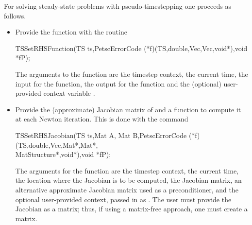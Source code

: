 For solving steady-state problems with pseudo-timestepping one proceeds 
as follows.
\begin{itemize}
\item Provide the function  with the routine
\begin{tabbing}
 TSSetRHSFunction(TS ts,PetscErrorCode (*f)(TS,double,Vec,Vec,void*),void *fP);
\end{tabbing}
The  arguments to the function  are
the timestep context, the current time, the input for the function,
the output for the function and the (optional) user-provided context
variable .

\item Provide the (approximate) Jacobian matrix of  and a 
function to compute it at each Newton iteration. This is done with the command
\begin{tabbing}
 TSSetRHSJacobian(\=TS ts,Mat A, Mat B,PetscErrorCode (*f)(TS,double,Vec,Mat*,Mat*,\\
                  \>        MatStructure*,void*),void *fP);
\end{tabbing}
The  arguments for the function  are
the timestep context, the current time, the location where the
Jacobian is to be computed, the Jacobian matrix, an alternative
approximate Jacobian matrix used as a preconditioner, and the optional
user-provided context, passed in as . The user must provide the 
Jacobian as a matrix; thus, if using a matrix-free approach, one 
must create a  matrix.
\end{itemize}

